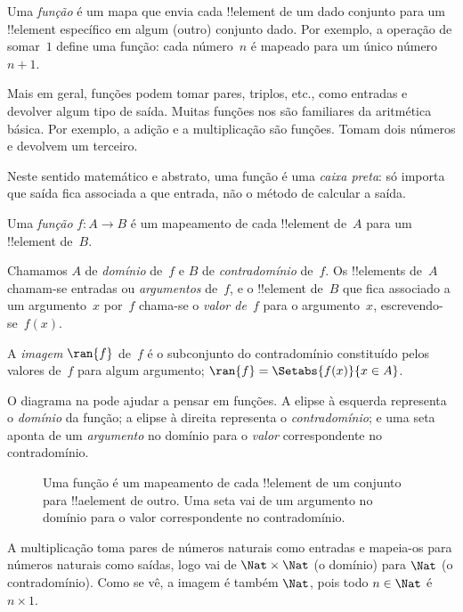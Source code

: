\documentclass[../../../include/open-logic-section]{subfiles}
\begin{document}

\begin{explain}
Uma \emph{função} é um mapa que envia cada !!{element} de um dado conjunto
para um !!{element} específico em algum (outro) conjunto dado. Por exemplo, a
operação de somar~$1$ define uma função: cada número~$n$ é mapeado
para um único número~$n+1$.

Mais em geral, funções podem tomar pares, triplos, etc., como entradas e
devolver algum tipo de saída. Muitas funções nos são familiares da
aritmética básica. Por exemplo, a adição e a multiplicação são
funções. Tomam dois números e devolvem um terceiro.

Neste sentido matemático e abstrato, uma função é uma \emph{caixa
preta}: só importa que saída fica associada a que entrada, não o
método de calcular a saída.
\end{explain}

\begin{defn}[Função]
Uma \emph{função} $f \colon A \to B$ é um mapeamento de cada !!{element}
de~$A$ para um !!{element} de~$B$.

Chamamos $A$ de \emph{domínio} de~$f$ e $B$ de \emph{contradomínio}
de~$f$. Os !!{element}s de~$A$ chamam-se entradas ou \emph{argumentos}
de~$f$, e o !!{element} de~$B$ que fica associado a um argumento~$x$
por~$f$ chama-se o \emph{valor de~$f$} para o argumento~$x$,
escrevendo-se~$f(x)$.

A \emph{imagem} $\ran{f}$ de~$f$ é o subconjunto do contradomínio
constituído pelos valores de~$f$ para algum argumento; $\ran{f} =
\Setabs{f(x)}{x \in A}$.
\end{defn}

O diagrama na  pode ajudar a pensar em funções. A elipse
à esquerda representa o \emph{domínio} da função; a elipse à
direita representa o \emph{contradomínio}; e uma seta
aponta de um \emph{argumento} no domínio para o \emph{valor}
correspondente no contradomínio.

\begin{figure}[H]
  \caption{Uma função é um mapeamento de cada !!{element} de um conjunto para
    !!a{element} de outro. Uma seta vai de um argumento no
    domínio para o valor correspondente no contradomínio.}
\end{figure}

\begin{ex}
A multiplicação toma pares de números naturais como entradas e mapeia-os
para números naturais como saídas, logo vai de $\Nat \times \Nat$ (o
domínio) para $\Nat$ (o contradomínio). Como se vê, a imagem é também
$\Nat$, pois todo $n \in \Nat$ é $n \times 1$.
\end{ex}
\end{document}
